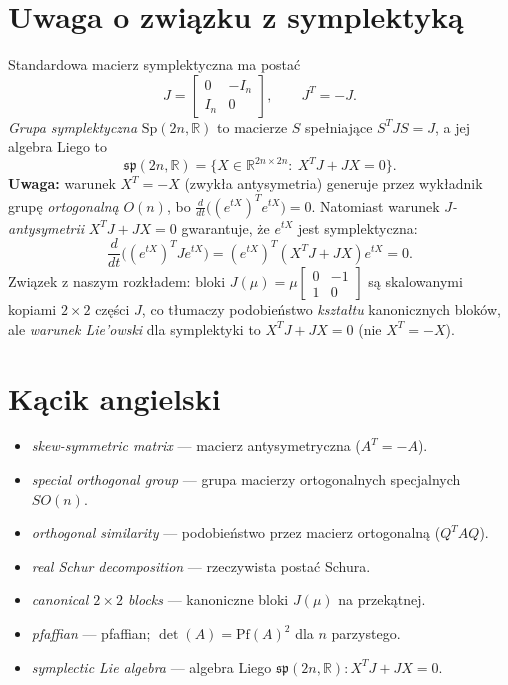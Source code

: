 \documentclass[12pt]{article}
\theoremstyle{plain}
\theoremstyle{remark}
\newcommand{\R}{\mathbb{R}}
\begin{document}
\section{Uwaga o związku z symplektyką }
Standardowa macierz symplektyczna ma postać
\[
J=\begin{bmatrix}0&-I_n\\ I_n&0\end{bmatrix},\qquad J^T=-J.
\]
\emph{Grupa symplektyczna} $\mathrm{Sp}(2n,\R)$ to macierze $S$ spełniające $S^T J S=J$,
a jej algebra Liego to
\[
\mathfrak{sp}(2n,\R)=\{X\in\R^{2n\times 2n}:\ X^T J+JX=0\}.
\]
\textbf{Uwaga:} warunek $X^T=-X$ (zwykła antysymetria) generuje przez wykładnik grupę
\emph{ortogonalną} $O(n)$, bo $\frac{d}{dt}\big((e^{tX})^T e^{tX}\big)=0$. Natomiast
warunek \emph{$J$-antysymetrii} $X^T J + J X=0$ gwarantuje, że $e^{tX}$ jest symplektyczna:
\[
\frac{d}{dt}\big((e^{tX})^T J e^{tX}\big)
=(e^{tX})^T(X^T J + J X)e^{tX}=0.
\]
Związek z naszym rozkładem: bloki $J(\mu)=\mu\begin{bmatrix}0&-1\\1&0\end{bmatrix}$ są skalowanymi
kopiami $2\times2$ części $J$, co tłumaczy podobieństwo \emph{kształtu} kanonicznych bloków,
ale \emph{warunek Lie’owski} dla symplektyki to $X^T J + J X=0$ (nie $X^T=-X$).

\section*{Kącik angielski}
\begin{itemize}[leftmargin=*,itemsep=2pt]
  \item \emph{skew-symmetric matrix} — macierz antysymetryczna ($A^T=-A$).
  \item \emph{special orthogonal group} --- grupa macierzy ortogonalnych specjalnych $SO(n)$.
  \item \emph{orthogonal similarity} — podobieństwo przez macierz ortogonalną ($Q^TAQ$).
  \item \emph{real Schur decomposition} --- rzeczywista postać Schura.
  \item \emph{canonical $2\times2$ blocks} — kanoniczne bloki $J(\mu)$ na przekątnej.
  \item \emph{pfaffian} — pfaffian; $\det(A)=\mathrm{Pf}(A)^2$ dla $n$ parzystego.
  \item \emph{symplectic Lie algebra} — algebra Liego $\mathfrak{sp}(2n,\R): X^T J+JX=0$.
\end{itemize}
\end{document}
